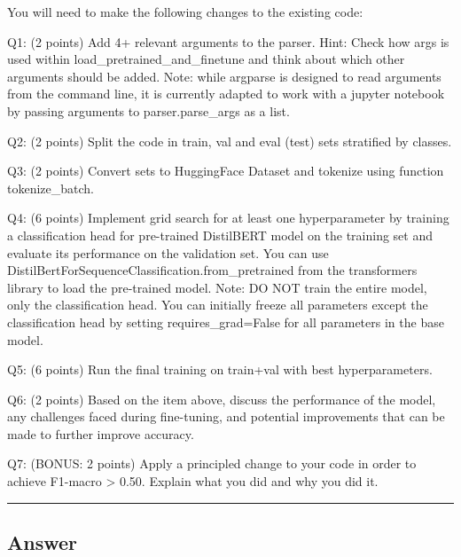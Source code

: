 \documentclass[
  letterpaper,
  DIV=11,
  numbers=noendperiod]{scrartcl}
\begin{document}
You will need to make the following changes to the existing code:

Q1: (2 points) Add 4+ relevant arguments to the parser. Hint: Check how
args is used within load\_pretrained\_and\_finetune and think about
which other arguments should be added. Note: while argparse is designed
to read arguments from the command line, it is currently adapted to work
with a jupyter notebook by passing arguments to parser.parse\_args as a
list.

Q2: (2 points) Split the code in train, val and eval (test) sets
stratified by classes.

Q3: (2 points) Convert sets to HuggingFace Dataset and tokenize using
function tokenize\_batch.

Q4: (6 points) Implement grid search for at least one hyperparameter by
training a classification head for pre-trained DistilBERT model on the
training set and evaluate its performance on the validation set. You can
use DistilBertForSequenceClassification.from\_pretrained from the
transformers library to load the pre-trained model. Note: DO NOT train
the entire model, only the classification head. You can initially freeze
all parameters except the classification head by setting
requires\_grad=False for all parameters in the base model.

Q5: (6 points) Run the final training on train+val with best
hyperparameters.

Q6: (2 points) Based on the item above, discuss the performance of the
model, any challenges faced during fine-tuning, and potential
improvements that can be made to further improve accuracy.

Q7: (BONUS: 2 points) Apply a principled change to your code in order to
achieve F1-macro \textgreater{} 0.50. Explain what you did and why you
did it.

\begin{center}\rule{0.5\linewidth}{0.5pt}\end{center}

\subsection{Answer}\label{answer-2}
\end{document}
